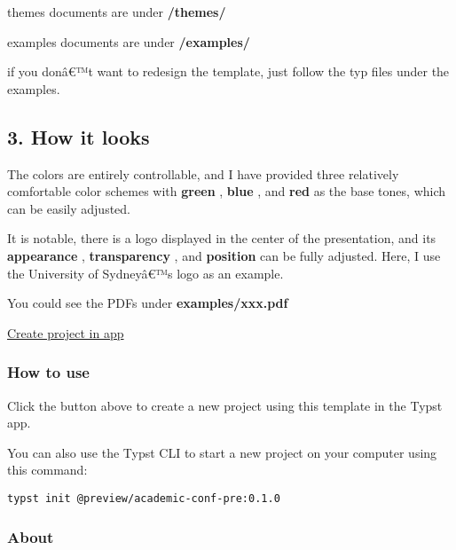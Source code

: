 themes documents are under \textbf{/themes/}

examples documents are under \textbf{/examples/}

if you donâ€™t want to redesign the template, just follow the typ files
under the examples.

\subsection{3. How it looks}\label{how-it-looks}

The colors are entirely controllable, and I have provided three
relatively comfortable color schemes with \textbf{green} , \textbf{blue}
, and \textbf{red} as the base tones, which can be easily adjusted.

It is notable, there is a logo displayed in the center of the
presentation, and its \textbf{appearance} , \textbf{transparency} , and
\textbf{position} can be fully adjusted. Here, I use the University of
Sydneyâ€™s logo as an example.

You could see the PDFs under \textbf{examples/xxx.pdf}

\href{/app?template=academic-conf-pre&version=0.1.0}{Create project in
app}

\subsubsection{How to use}\label{how-to-use}

Click the button above to create a new project using this template in
the Typst app.

You can also use the Typst CLI to start a new project on your computer
using this command:

\begin{verbatim}
typst init @preview/academic-conf-pre:0.1.0
\end{verbatim}



\subsubsection{About}\label{about}

